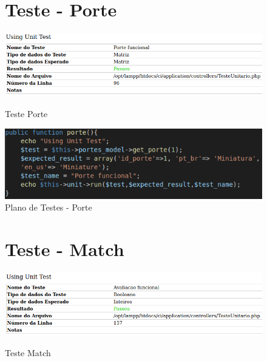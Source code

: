 \begin{apendicesenv}
\begin{figure}[!htbp]
\begin{flushleft}
    \section{Teste - Porte}
\end{flushleft}
    \centering
    \caption{Teste Porte}
    \includegraphics[width=1\textwidth,pagecommand=\chapter{}]{imagens/teste_porte.png}
    \label{teste-porte}
\end{figure}

\begin{figure}[htb]
    \centering
    \caption{\label{fig_timeline}Plano de Testes - Porte}
	\includegraphics[width=1\textwidth]{imagens/cod_teste_porte.png}
\end{figure}

\begin{figure}[!htbp]
\begin{flushleft}
    \section{Teste - Match}
\end{flushleft}
    \centering
    \caption{Teste Match}
    \includegraphics[width=1\textwidth,pagecommand=\chapter{}]{imagens/teste_set_match.png}
    \label{teste-set-match}
\end{figure}


\end{apendicesenv}
